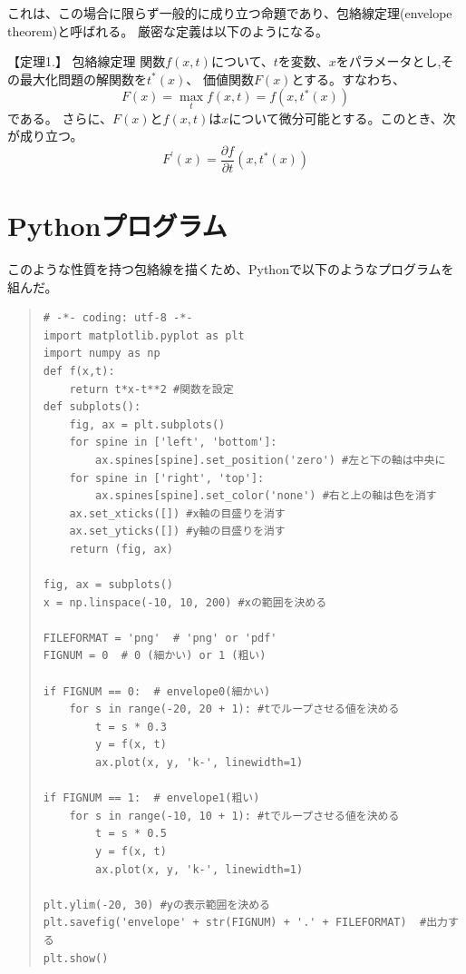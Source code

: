 \documentclass[11pt,a4j,fleqn]{jarticle}
\begin{document}
これは、この場合に限らず一般的に成り立つ命題であり、包絡線定理(envelope theorem)と呼ばれる。
厳密な定義は以下のようになる。

\vspace{0.3cm}

\begin{itembox}[1]{ \Large 【定理1.】  包絡線定理}
 関数$f(x , t) $について、$t$を変数、$x$をパラメータとし,その最大化問題の解関数を$t^*(x)$、
 価値関数$F(x)$とする。すなわち、
 \[F(x) = \max_{t} {f(x,t)} = f(x , t^*(x))\]
 である。
 さらに、$F(x)$と$f(x,t)$は$x$について微分可能とする。このとき、次が成り立つ。
 \begin{equation}
  F^{'}(x) = \frac{\partial f}{\partial t} (x , t^*(x))
 \end{equation}
\end{itembox}

\vspace{0.3cm}

\newpage

\section{Pythonプログラム}

このような性質を持つ包絡線を描くため、Pythonで以下のようなプログラムを組んだ。

\begin{quote}
\begin{verbatim}
# -*- coding: utf-8 -*-
import matplotlib.pyplot as plt
import numpy as np
def f(x,t):
    return t*x-t**2 #関数を設定
def subplots():
    fig, ax = plt.subplots()
    for spine in ['left', 'bottom']:
        ax.spines[spine].set_position('zero') #左と下の軸は中央に
    for spine in ['right', 'top']:
        ax.spines[spine].set_color('none') #右と上の軸は色を消す
    ax.set_xticks([]) #x軸の目盛りを消す
    ax.set_yticks([]) #y軸の目盛りを消す
    return (fig, ax)

fig, ax = subplots()
x = np.linspace(-10, 10, 200) #xの範囲を決める

FILEFORMAT = 'png'  # 'png' or 'pdf'
FIGNUM = 0  # 0 (細かい) or 1 (粗い)

if FIGNUM == 0:  # envelope0(細かい)
    for s in range(-20, 20 + 1): #tでループさせる値を決める
        t = s * 0.3
        y = f(x, t)
        ax.plot(x, y, 'k-', linewidth=1)

if FIGNUM == 1:  # envelope1(粗い)
    for s in range(-10, 10 + 1): #tでループさせる値を決める
        t = s * 0.5
        y = f(x, t)
        ax.plot(x, y, 'k-', linewidth=1)

plt.ylim(-20, 30) #yの表示範囲を決める
plt.savefig('envelope' + str(FIGNUM) + '.' + FILEFORMAT)  #出力する
plt.show()
\end{verbatim}
\end{quote}
\end{document}
